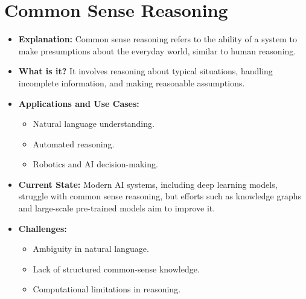 \documentclass[english,version-2020-11]{uzl-thesis}
\begin{document}
  \section{Common Sense Reasoning}
  \begin{itemize}
      \item \textbf{Explanation:} Common sense reasoning refers to the ability of a system to make presumptions about the everyday world, similar to human reasoning.
      \item \textbf{What is it?} It involves reasoning about typical situations, handling incomplete information, and making reasonable assumptions.
      \item \textbf{Applications and Use Cases:}
      \begin{itemize}
          \item Natural language understanding.
          \item Automated reasoning.
          \item Robotics and AI decision-making.
      \end{itemize}
      \item \textbf{Current State:} Modern AI systems, including deep learning models, struggle with common sense reasoning, but efforts such as knowledge graphs and large-scale pre-trained models aim to improve it.
      \item \textbf{Challenges:}
      \begin{itemize}
          \item Ambiguity in natural language.
          \item Lack of structured common-sense knowledge.
          \item Computational limitations in reasoning.
      \end{itemize}
  \end{itemize}
\end{document}

